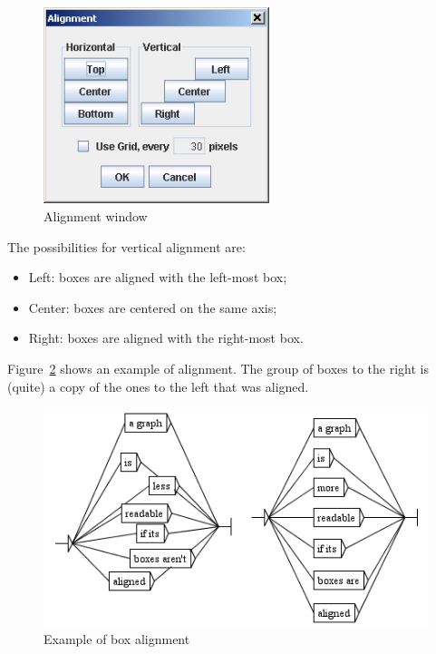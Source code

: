 \begin{figure}[!h]
\begin{center}
\includegraphics[width=6.6cm]{resources/img/fig5-23.png}
\caption{Alignment window\label{fig-alignment-frame}}
\end{center}
\end{figure}

\noindent The possibilities for vertical alignment are:
\begin{itemize}
  \item Left: boxes are aligned with the left-most box;
  \item Center: boxes are centered on the same axis;
  \item Right: boxes are aligned with the right-most box.
\end{itemize}

\bigskip
\noindent Figure~\ref{fig-vertical-left-alignment} shows an example
of alignment. The group of boxes to the right is (quite) a copy of the ones to the
left that was aligned.

\bigskip
\begin{figure}[!h]
\begin{center}
\includegraphics[width=11.5cm]{resources/img/fig5-24.png}
\caption{Example of box alignment\label{fig-vertical-left-alignment}}
\end{center}
\end{figure}

